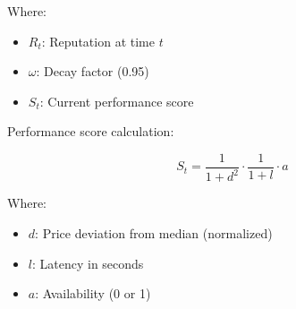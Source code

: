 Where:
\begin{itemize}
    \item $R_t$: Reputation at time $t$
    \item $\omega$: Decay factor (0.95)
    \item $S_t$: Current performance score
\end{itemize}

Performance score calculation:

\begin{equation}
S_t = \frac{1}{1 + d^2} \cdot \frac{1}{1 + l} \cdot a
\end{equation}

Where:
\begin{itemize}
    \item $d$: Price deviation from median (normalized)
    \item $l$: Latency in seconds
    \item $a$: Availability (0 or 1)
\end{itemize}

